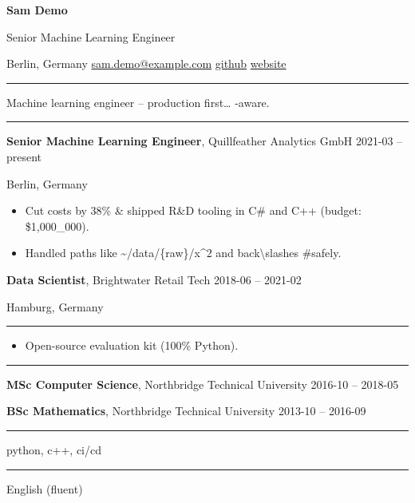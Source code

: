 \documentclass[11pt,a4paper]{article}
\newcommand{\cvsection}[1]{\vspace{8pt}{\large\bfseries #1}\par\vspace{2pt}\hrule\vspace{4pt}}
\begin{document}
{\LARGE\bfseries Sam Demo}\par
{\large Senior Machine Learning Engineer}\par
\vspace{2pt}
Berlin, Germany \textbar{} \href{mailto:sam.demo@example.com}{sam.demo@example.com} \textbar{} \href{https://github.com/sam-demo-example}{github}
 \textbar{} \href{https://sam-demo.example.com}{website}
\par

\cvsection{Summary}
Machine learning engineer -- production first\ldots{} \texteuro{}-aware.
\par

\cvsection{Experience}
\textbf{Senior Machine Learning Engineer}, Quillfeather Analytics GmbH \hfill 2021-03 -- present\par
{\small Berlin, Germany}\par
\begin{itemize}
  \item Cut costs by 38\% \& shipped R\&D tooling in C\# and C++ (budget: \$1,000\_000).
  \item Handled paths like \textasciitilde{}/data/\{raw\}/x\textasciicircum{}2 and back\textbackslash{}slashes \#safely.
\end{itemize}
\vspace{4pt}
\textbf{Data Scientist}, Brightwater Retail Tech \hfill 2018-06 -- 2021-02\par
{\small Hamburg, Germany}\par
\vspace{4pt}

\cvsection{Projects}
\begin{itemize}
  \item Open-source evaluation kit (100\% Python).
\end{itemize}

\cvsection{Education}
\textbf{MSc Computer Science}, Northbridge Technical University \hfill 2016-10 -- 2018-05\par
\textbf{BSc Mathematics}, Northbridge Technical University \hfill 2013-10 -- 2016-09\par

\cvsection{Skills}
python, c++, ci/cd\par

\cvsection{Languages}
English (fluent)\par
\end{document}
